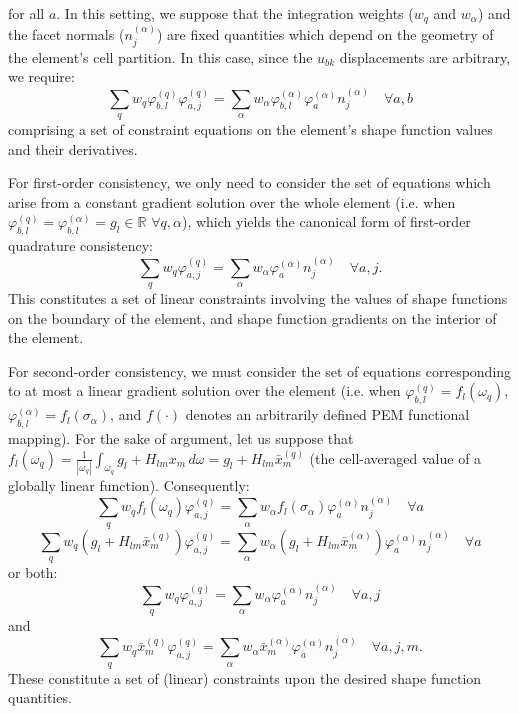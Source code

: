\documentclass[11pt]{article} %
\begin{document}
for all $a$. In this setting, we suppose that the integration weights ($w_q$ and $w_{\alpha}$) and the facet normals ($n^{(\alpha)}_j$) are fixed quantities which depend on the geometry of the element's cell partition. In this case, since the $u_{bk}$ displacements are arbitrary, we require:
\begin{equation}
	\sum_q w_q \varphi^{(q)}_{b,l} \varphi^{(q)}_{a,j} = \sum_{\alpha} w_{\alpha} \varphi^{(\alpha)}_{b,l} \varphi^{(\alpha)}_a n^{(\alpha)}_j \quad \forall a, b
\end{equation}
comprising a set of constraint equations on the element's shape function values and their derivatives.

For first-order consistency, we only need to consider the set of equations which arise from a constant gradient solution over the whole element (i.e. when $\varphi^{(q)}_{b,l} = \varphi^{(\alpha)}_{b,l} = g_l \in \mathbb{R} \, \, \forall q, \alpha$), which yields the canonical form of first-order quadrature consistency:
\begin{equation}
	\sum_q w_q \varphi^{(q)}_{a,j} = \sum_{\alpha} w_{\alpha} \varphi^{(\alpha)}_a n^{(\alpha)}_j \quad \forall a, j.
\end{equation}
This constitutes a set of linear constraints involving the values of shape functions on the boundary of the element, and shape function gradients on the interior of the element.

For second-order consistency, we must consider the set of equations corresponding to at most a linear gradient solution over the element (i.e. when $\varphi^{(q)}_{b,l} = f_l ( \omega_q )$, $\varphi^{(\alpha)}_{b,l} = f_l ( \sigma_{\alpha} )$, and $f ( \cdot )$ denotes an arbitrarily defined PEM functional mapping). For the sake of argument, let us suppose that $f_l ( \omega_q ) = \frac{1}{| \omega_q |} \int_{\omega_q} g_l + H_{lm} x_m \, d \omega = g_l + H_{lm} \bar{x}^{(q)}_m$ (the cell-averaged value of a globally linear function). Consequently:
\begin{equation}
	\sum_q w_q f_l ( \omega_q ) \varphi^{(q)}_{a,j} = \sum_{\alpha} w_{\alpha} f_l ( \sigma_{\alpha} ) \varphi^{(\alpha)}_a n^{(\alpha)}_j \quad \forall a
\end{equation}
\begin{equation}
	\sum_q w_q (g_l + H_{lm} \bar{x}^{(q)}_m) \varphi^{(q)}_{a,j} = \sum_{\alpha} w_{\alpha} (g_l + H_{lm} \bar{x}^{(\alpha)}_m) \varphi^{(\alpha)}_a n^{(\alpha)}_j \quad \forall a
\end{equation}
or both:
\begin{equation}
	\sum_q w_q \varphi^{(q)}_{a,j} = \sum_{\alpha} w_{\alpha} \varphi^{(\alpha)}_a n^{(\alpha)}_j \quad \forall a, j
\end{equation}
and
\begin{equation}
	\sum_q w_q \bar{x}^{(q)}_m \varphi^{(q)}_{a,j} = \sum_{\alpha} w_{\alpha} \bar{x}^{(\alpha)}_m \varphi^{(\alpha)}_a n^{(\alpha)}_j \quad \forall a, j, m.
\end{equation}
These constitute a set of (linear) constraints upon the desired shape function quantities.
\end{document}
